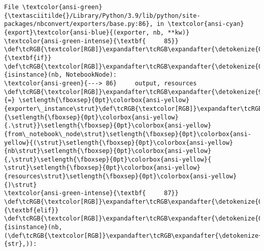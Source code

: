\documentclass[11pt]{article}
\begin{document}
\begin{Verbatim}[commandchars=\\\{\}, frame=single, framerule=2mm, rulecolor=\color{outerrorbackground}]
File \textcolor{ansi-green}{\textasciitilde{}/Library/Python/3.9/lib/python/site-packages/nbconvert/exporters/base.py:86}, in \textcolor{ansi-cyan}{export}\textcolor{ansi-blue}{(exporter, nb, **kw)}
\textcolor{ansi-green-intense}{\textbf{     85}} \def\tcRGB{\textcolor[RGB]}\expandafter\tcRGB\expandafter{\detokenize{0,135,0}}{\textbf{if}} \def\tcRGB{\textcolor[RGB]}\expandafter\tcRGB\expandafter{\detokenize{0,135,0}}{isinstance}(nb, NotebookNode):
\textcolor{ansi-green}{---> 86}     output, resources \def\tcRGB{\textcolor[RGB]}\expandafter\tcRGB\expandafter{\detokenize{98,98,98}}{=} \setlength{\fboxsep}{0pt}\colorbox{ansi-yellow}{exporter\_instance\strut}\def\tcRGB{\textcolor[RGB]}\expandafter\tcRGB\expandafter{\detokenize{98,98,98}}{\setlength{\fboxsep}{0pt}\colorbox{ansi-yellow}{.\strut}}\setlength{\fboxsep}{0pt}\colorbox{ansi-yellow}{from\_notebook\_node\strut}\setlength{\fboxsep}{0pt}\colorbox{ansi-yellow}{(\strut}\setlength{\fboxsep}{0pt}\colorbox{ansi-yellow}{nb\strut}\setlength{\fboxsep}{0pt}\colorbox{ansi-yellow}{,\strut}\setlength{\fboxsep}{0pt}\colorbox{ansi-yellow}{ \strut}\setlength{\fboxsep}{0pt}\colorbox{ansi-yellow}{resources\strut}\setlength{\fboxsep}{0pt}\colorbox{ansi-yellow}{)\strut}
\textcolor{ansi-green-intense}{\textbf{     87}} \def\tcRGB{\textcolor[RGB]}\expandafter\tcRGB\expandafter{\detokenize{0,135,0}}{\textbf{elif}} \def\tcRGB{\textcolor[RGB]}\expandafter\tcRGB\expandafter{\detokenize{0,135,0}}{isinstance}(nb, (\def\tcRGB{\textcolor[RGB]}\expandafter\tcRGB\expandafter{\detokenize{0,135,0}}{str},)):


\end{Verbatim}
\end{document}
